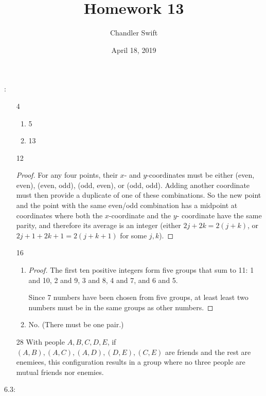 \documentclass{article}
\title{Homework 13}
\author{Chandler Swift}
\date{April 18, 2019}
\begin{document}
:
\begin{enumerate}
  \item[4]
    \begin{enumerate}
      \item 5
      \item 13
    \end{enumerate}
  \item[12]
    \begin{proof}
      For any four points, their $x$- and $y$-coordinates must be either
      (even, even), (even, odd), (odd, even), or (odd, odd). Adding another
      coordinate must then provide a duplicate of one of these combinations.
      So the new point and the point with the same even/odd combination has a
      midpoint at coordinates where both the $x$-coordinate and the $y$-
      coordinate have the same parity, and therefore its average is an integer
      (either $2j + 2k = 2(j+k)$, or $2j+1 + 2k+1 = 2(j+k+1)$ for some $j,k$).
    \end{proof}    
  \item[16]
    \begin{enumerate}
      \item
        \begin{proof}
          The first ten positive integers form five groups that sum to 11:
          1 and 10, 2 and 9, 3 and 8, 4 and 7, and 6 and 5.

          Since 7 numbers have been chosen from five groups, at least least
          two numbers must be in the same groups as other numbers.
        \end{proof}
      \item No. (There must be one pair.)
    \end{enumerate}
  \item[28] With people $A,B,C,D,E$, if $(A,B),(A,C),(A,D),(D,E),(C,E)$ are
    friends and the rest are enemiees, this configuration results in a group
    where no three people are mutual friends nor enemies.
\end{enumerate}
6.3:
\end{document}

